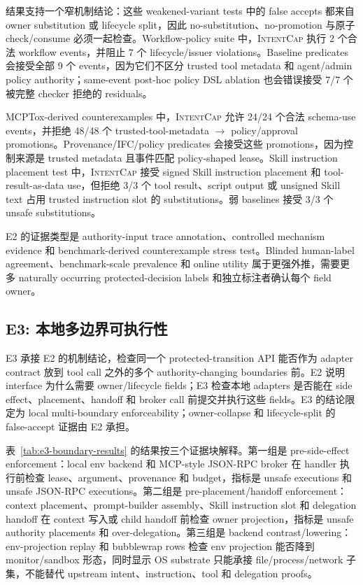 \documentclass[UTF8,a4paper,11pt]{ctexart}
\newcommand{\sys}{\textsc{IntentCap}\xspace}
\begin{document}
结果支持一个窄机制结论：这些 weakened-variant tests 中的 false accepts 都来自 owner substitution 或 lifecycle split，因此 no-substitution、no-promotion 与原子 check/consume 必须一起检查。Workflow-policy suite 中，\sys 执行 2 个合法 workflow events，并阻止 7 个 lifecycle/issuer violations。Baseline predicates 会接受全部 9 个 events，因为它们不区分 trusted tool metadata 和 agent/admin policy authority；same-event post-hoc policy DSL ablation 也会错误接受 7/7 个被完整 checker 拒绝的 residuals。

MCPTox-derived counterexamples 中，\sys 允许 24/24 个合法 schema-use events，并拒绝 48/48 个 trusted-tool-metadata \(\rightarrow\) policy/approval promotions。Provenance/IFC/policy predicates 会接受这些 promotions，因为控制来源是 trusted metadata 且事件匹配 policy-shaped lease。Skill instruction placement test 中，\sys 接受 signed Skill instruction placement 和 tool-result-as-data use，但拒绝 3/3 个 tool result、script output 或 unsigned Skill text 占用 trusted instruction slot 的 substitutions。弱 baselines 接受 3/3 个 unsafe substitutions。

E2 的证据类型是 authority-input trace annotation、controlled mechanism evidence 和 benchmark-derived counterexample stress test。Blinded human-label agreement、benchmark-scale prevalence 和 online utility 属于更强外推，需要更多 naturally occurring protected-decision labels 和独立标注者确认每个 field owner。

\subsection{E3: 本地多边界可执行性}

E3 承接 E2 的机制结论，检查同一个 protected-transition API 能否作为 adapter contract 放到 tool call 之外的多个 authority-changing boundaries 前。E2 说明 interface 为什么需要 owner/lifecycle fields；E3 检查本地 adapters 是否能在 side effect、placement、handoff 和 broker call 前提交并执行这些 fields。E3 的结论限定为 local multi-boundary enforceability；owner-collapse 和 lifecycle-split 的 false-accept 证据由 E2 承担。

表~\ref{tab:e3-boundary-results} 的结果按三个证据块解释。第一组是 pre-side-effect enforcement：local env backend 和 MCP-style JSON-RPC broker 在 handler 执行前检查 lease、argument、provenance 和 budget，指标是 unsafe executions 和 unsafe JSON-RPC executions。第二组是 pre-placement/handoff enforcement：context placement、prompt-builder assembly、Skill instruction slot 和 delegation handoff 在 context 写入或 child handoff 前检查 owner projection，指标是 unsafe authority placements 和 over-delegation。第三组是 backend contrast/lowering：env-projection replay 和 bubblewrap rows 检查 env projection 能否降到 monitor/sandbox 形态，同时显示 OS substrate 只能承接 file/process/network 子集，不能替代 upstream intent、instruction、tool 和 delegation proofs。
\end{document}
